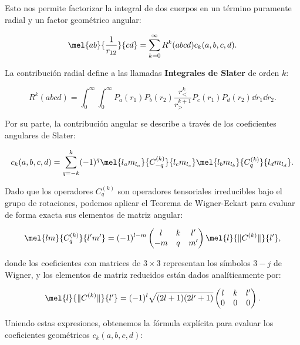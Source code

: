 Esto nos permite factorizar la integral de dos cuerpos en un término puramente radial y un factor geométrico angular:

\begin{equation}
  \mel{ab}{\frac{1}{r_{12}}}{cd} = \sum_{k=0}^{\infty} R^k(abcd) c_k(a,b,c,d).
\end{equation}

La contribución radial define a las llamadas \textbf{Integrales de Slater} de orden \( k \):

\begin{equation}
  \label{eq:slater-integral}
  R^k(abcd) = \int_0^\infty \int_0^\infty P_a(r_1) P_b(r_2) \frac{r_{<}^k}{r_{>}^{k+1}} P_c(r_1) P_d(r_2) \dd{r_1} \dd{r_2}.
\end{equation}

Por su parte, la contribución angular se describe a través de los coeficientes angulares de Slater:

\begin{equation}
  c_k(a,b,c,d) = \sum_{q=-k}^k (-1)^q \mel{l_a m_{l_a}}{C_{-q}^{(k)}}{l_c m_{l_c}} \mel{l_b m_{l_b}}{C_q^{(k)}}{l_d m_{l_d}}.
\end{equation}

Dado que los operadores \( C_{q}^{(k)} \) son operadores tensoriales irreducibles bajo el grupo de rotaciones, podemos aplicar el Teorema de Wigner-Eckart para evaluar de forma exacta sus elementos de matriz angular:

\begin{equation}
  \mel{lm}{C_{q}^{(k)}}{l'm'} = (-1)^{l-m} \begin{pmatrix} l & k & l' \\ -m & q & m' \end{pmatrix} \mel{l}{\|C^{(k)}\|}{l'},
\end{equation}

donde los coeficientes con matrices de \( 3 \times 3 \) representan los símbolos \( 3-j \) de Wigner, y los elementos de matriz reducidos están dados analíticamente por:

\begin{equation}
  \mel{l}{\|C^{(k)}\|}{l'} = (-1)^l \sqrt{(2l+1)(2l'+1)} \begin{pmatrix} l & k & l' \\ 0 & 0 & 0 \end{pmatrix}.
\end{equation}

Uniendo estas expresiones, obtenemos la fórmula explícita para evaluar los coeficientes geométricos \( c_k(a,b,c,d) \):

